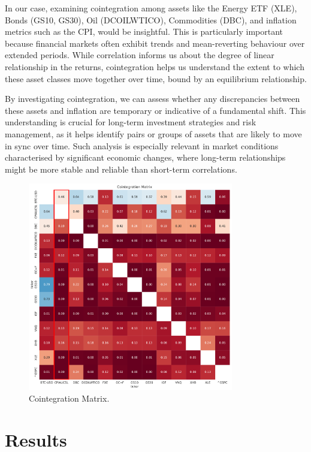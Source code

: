 \documentclass{article}
\begin{document}
In our case, examining cointegration among assets like the Energy ETF (XLE), Bonds (GS10, GS30), Oil (DCOILWTICO), Commodities (DBC), and inflation metrics such as the CPI, would be insightful. This is particularly important because financial markets often exhibit trends and mean-reverting behaviour over extended periods. While correlation informs us about the degree of linear relationship in the returns, cointegration helps us understand the extent to which these asset classes move together over time, bound by an equilibrium relationship.

By investigating cointegration, we can assess whether any discrepancies between these assets and inflation are temporary or indicative of a fundamental shift. This understanding is crucial for long-term investment strategies and risk management, as it helps identify pairs or groups of assets that are likely to move in sync over time. Such analysis is especially relevant in market conditions characterised by significant economic changes, where long-term relationships might be more stable and reliable than short-term correlations.

\begin{figure}[H]
    \centering
    \includegraphics[width=0.8\textwidth]{paper/figure/Cointegration_Matrix.pdf}
    \caption{Cointegration Matrix.}
    \label{fig:mesh3}
\end{figure}

\section{Results}
\end{document}
